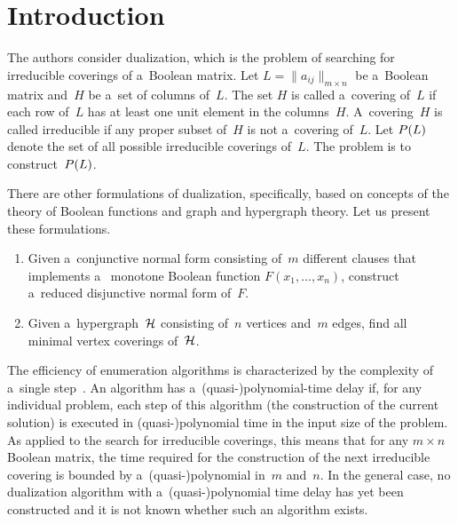       \begin{multicols}{2}

                  \label{st\stat}
                  



\section{Introduction}



\noindent
The authors consider dualization, which is the problem of searching for
irreducible coverings of a~Boolean matrix. Let $L = \| a_{ij}
\|_{m \times n}$ be a~Boolean matrix and~$H$ be a~set of columns
of~$L$. The set $H$ is called a~{covering} of~$L$ if each row
of~$L$ has at least one unit element in the columns~$H$. 
A~covering~$H$ is called {irreducible} if any proper subset
of~$H$ is not a~covering of~$L$. Let $P(L)$ denote the set of
all possible irreducible coverings of~$L$. The problem is to
construct~$P(L)$.

There are other formulations of dualization, specifically, based
on concepts of the theory of Boolean functions and graph and
hypergraph theory. Let us present these formulations.

\begin{enumerate}[1.]
    \item
    Given a~conjunctive normal form consisting of~$m$ different 
    clauses that implements a~    monotone Boolean function $F(x_1,\ldots,x_n)$,
    construct a~reduced disjunctive normal form of~$F$.
    \item
    Given a~hypergraph~$\mathcal{H}$  consisting of~$n$  vertices and~$m$ edges, 
    find all minimal
    vertex coverings of~$\mathcal{H}$.
\end{enumerate}

The efficiency of enumeration algorithms is characterized by the
complexity of a~single step~\cite{JYP1988}. An algorithm has
a~(quasi-)polynomial-time delay if, for any individual problem,
each step of this algorithm (the construction of the current
solution) is executed in (quasi-)polynomial time in the input size
of the problem. As applied to the search for irreducible
coverings, this means that for any $m{\times}n$ Boolean matrix,
the time required for the construction of the next irreducible
covering is bounded by a~\mbox{(quasi-)polynomial} in~$m$ and~$n$. In the
general case, no dualization algorithm with a~(quasi-)polynomial
time delay has yet been constructed and it is not known whether
such an algorithm exists. 
{

}
\end{multicols}
